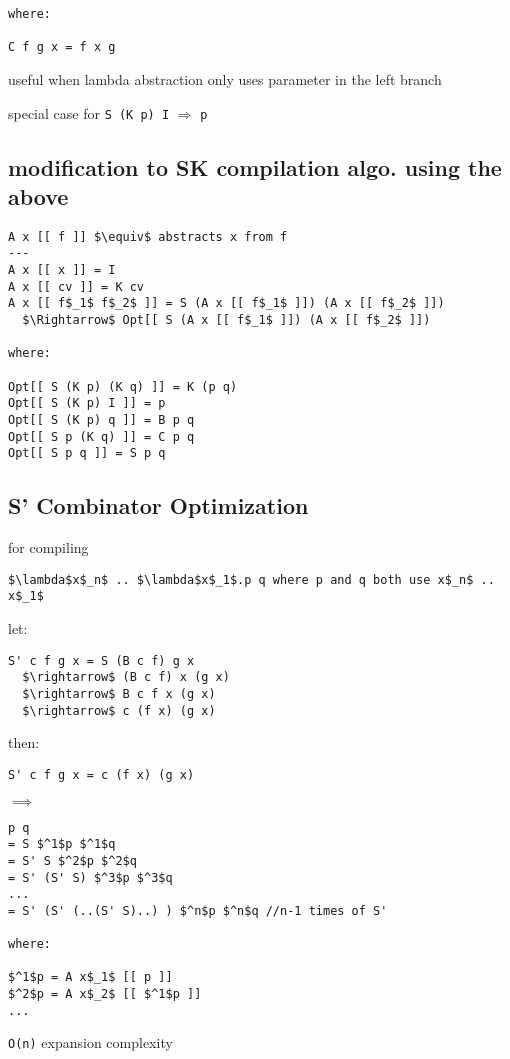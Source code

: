 \documentclass[8pt]{extarticle}
\begin{document}
\begin{multicols*}{2}
\begin{lstlisting}
where:

C f g x = f x g
\end{lstlisting}

useful when lambda abstraction only uses parameter in the left branch

special case for \verb|S (K p) I| $\Rightarrow$ \verb|p|

\subsection{modification to SK compilation algo. using the above}

\begin{lstlisting}
A x [[ f ]] $\equiv$ abstracts x from f
---
A x [[ x ]] = I
A x [[ cv ]] = K cv
A x [[ f$_1$ f$_2$ ]] = S (A x [[ f$_1$ ]]) (A x [[ f$_2$ ]])
  $\Rightarrow$ Opt[[ S (A x [[ f$_1$ ]]) (A x [[ f$_2$ ]])

where:

Opt[[ S (K p) (K q) ]] = K (p q)
Opt[[ S (K p) I ]] = p
Opt[[ S (K p) q ]] = B p q
Opt[[ S p (K q) ]] = C p q
Opt[[ S p q ]] = S p q
\end{lstlisting}

\subsection{S' Combinator Optimization}
for compiling
\begin{lstlisting}
$\lambda$x$_n$ .. $\lambda$x$_1$.p q where p and q both use x$_n$ .. x$_1$
\end{lstlisting}

let:
\begin{lstlisting}
S' c f g x = S (B c f) g x
  $\rightarrow$ (B c f) x (g x)
  $\rightarrow$ B c f x (g x)
  $\rightarrow$ c (f x) (g x)
\end{lstlisting}

then:

\verb|S' c f g x = c (f x) (g x)|

$\implies$

\begin{lstlisting}
p q
= S $^1$p $^1$q
= S' S $^2$p $^2$q
= S' (S' S) $^3$p $^3$q
...
= S' (S' (..(S' S)..) ) $^n$p $^n$q //n-1 times of S'

where:

$^1$p = A x$_1$ [[ p ]]
$^2$p = A x$_2$ [[ $^1$p ]]
...
\end{lstlisting}

\verb|O(n)| expansion complexity


\end{multicols*}
\end{document}
